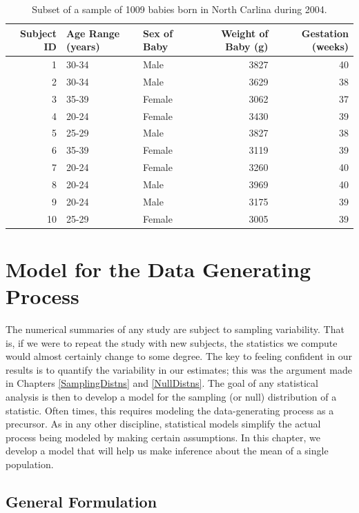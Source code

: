 \documentclass[]{book}
\theoremstyle{plain}
\theoremstyle{mydefn}
\theoremstyle{myexmpl}
\theoremstyle{remark}
\begin{document}
\begin{table}

\caption{\label{tab:casebabies-table}Subset of a sample of 1009 babies born in North Carlina during 2004.}
\centering
\begin{tabular}[t]{r|l|l|r|r}
\hline
Subject ID & Age Range (years) & Sex of Baby & Weight of Baby (g) & Gestation (weeks)\\
\hline
1 & 30-34 & Male & 3827 & 40\\
\hline
2 & 30-34 & Male & 3629 & 38\\
\hline
3 & 35-39 & Female & 3062 & 37\\
\hline
4 & 20-24 & Female & 3430 & 39\\
\hline
5 & 25-29 & Male & 3827 & 38\\
\hline
6 & 35-39 & Female & 3119 & 39\\
\hline
7 & 20-24 & Female & 3260 & 40\\
\hline
8 & 20-24 & Male & 3969 & 40\\
\hline
9 & 20-24 & Male & 3175 & 39\\
\hline
10 & 25-29 & Female & 3005 & 39\\
\hline
\end{tabular}
\end{table}

\chapter{Model for the Data Generating Process}\label{MeanModels}

The numerical summaries of any study are subject to sampling
variability. That is, if we were to repeat the study with new subjects,
the statistics we compute would almost certainly change to some degree.
The key to feeling confident in our results is to quantify the
variability in our estimates; this was the argument made in Chapters
\ref{SamplingDistns} and \ref{NullDistns}. The goal of any statistical
analysis is then to develop a model for the sampling (or null)
distribution of a statistic. Often times, this requires modeling the
data-generating process as a precursor. As in any other discipline,
statistical models simplify the actual process being modeled by making
certain assumptions. In this chapter, we develop a model that will help
us make inference about the mean of a single population.

\section{General Formulation}\label{general-formulation}
\end{document}
